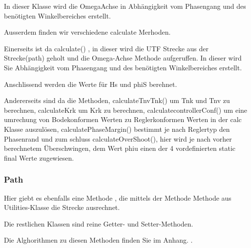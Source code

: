 In dieser Klasse wird die OmegaAchse  in Abh\"angigkeit vom Phasengang und des
ben\"otigten Winkelbereiches erstellt.

Ausserdem finden wir verschiedene calculate Merhoden.

Einerseits  ist da  calculate()  , in  dieser  wird die  UTF  Strecke aus  der
Strecke(path)  geholt  und  die  Omega-Achse  Methode  aufgeruffen. In  dieser
wird Sie  Abh\"angigkeit vom  Phasengang und des  ben\"otigten Winkelbereiches
erstellt.

Anschlissend werden die Werte f\"ur Hs und phiS berehnet.

Andererseits  sind  da die  Methoden,  calculateTnvTnk()  um  Tnk und  Tnv  zu
berechnen, calculateKrk um Krk zu berechnen, calculatecontrollerConf() um eine
umrechung  von Bodekonformen  Werten  zu Reglerkonformen  Werten  in der  calc
Klasse  auszul\"osen, calculatePhaseMargin()  bestimmt je  nach Reglertyp  den
Phasenrand  und zum  schluss calculateOverShoot(),  hier wird  je nach  vorher
berechnetem \"Uberschwingen, dem  Wert phiu einen der  4 vordefinierten static
final Werte zugewiesen.



\subsubsection*{Path}

Hier  giebt es  ebenfalls  eine Methode  ,  die mittels  der
Methode   Methode  aus Utilities-Klasse   die  Strecke
ausrechnet.

Die restlichen Klassen sind reine Getter- und Setter-Methoden.

Die  Alghorithmen zu  diesen  Methoden finden  Sie  im Anhang.  .
